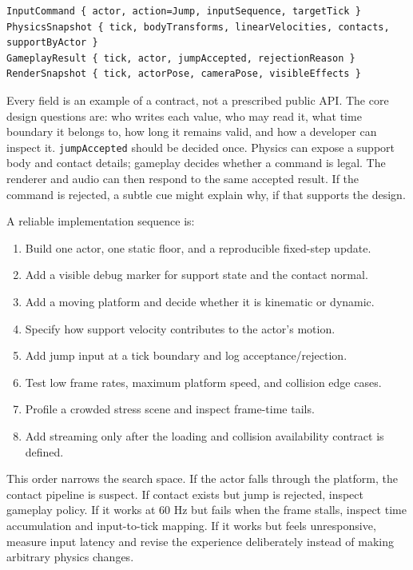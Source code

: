 \begin{verbatim}
InputCommand { actor, action=Jump, inputSequence, targetTick }
PhysicsSnapshot { tick, bodyTransforms, linearVelocities, contacts, supportByActor }
GameplayResult { tick, actor, jumpAccepted, rejectionReason }
RenderSnapshot { tick, actorPose, cameraPose, visibleEffects }
\end{verbatim}

Every field is an example of a contract, not a prescribed public API. The core design questions are: who writes each value, who may read it, what time boundary it belongs to, how long it remains valid, and how a developer can inspect it. \texttt{jumpAccepted} should be decided once. Physics can expose a support body and contact details; gameplay decides whether a command is legal. The renderer and audio can then respond to the same accepted result. If the command is rejected, a subtle cue might explain why, if that supports the design.

A reliable implementation sequence is:

\begin{enumerate}
\def\labelenumi{\arabic{enumi}.}
\tightlist
\item
  Build one actor, one static floor, and a reproducible fixed-step update.
\item
  Add a visible debug marker for support state and the contact normal.
\item
  Add a moving platform and decide whether it is kinematic or dynamic.
\item
  Specify how support velocity contributes to the actor's motion.
\item
  Add jump input at a tick boundary and log acceptance/rejection.
\item
  Test low frame rates, maximum platform speed, and collision edge cases.
\item
  Profile a crowded stress scene and inspect frame-time tails.
\item
  Add streaming only after the loading and collision availability contract is defined.
\end{enumerate}

This order narrows the search space. If the actor falls through the platform, the contact pipeline is suspect. If contact exists but jump is rejected, inspect gameplay policy. If it works at 60 Hz but fails when the frame stalls, inspect time accumulation and input-to-tick mapping. If it works but feels unresponsive, measure input latency and revise the experience deliberately instead of making arbitrary physics changes.

